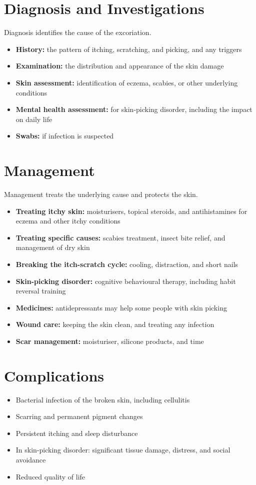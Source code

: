 \section*{Diagnosis and Investigations}
Diagnosis identifies the cause of the excoriation.
\begin{itemize}
    \item \textbf{History:} the pattern of itching, scratching, and picking, and any triggers
    \item \textbf{Examination:} the distribution and appearance of the skin damage
    \item \textbf{Skin assessment:} identification of eczema, scabies, or other underlying conditions
    \item \textbf{Mental health assessment:} for skin-picking disorder, including the impact on daily life
    \item \textbf{Swabs:} if infection is suspected
\end{itemize}

\section*{Management}
Management treats the underlying cause and protects the skin.
\begin{itemize}
    \item \textbf{Treating itchy skin:} moisturisers, topical steroids, and antihistamines for eczema and other itchy conditions
    \item \textbf{Treating specific causes:} scabies treatment, insect bite relief, and management of dry skin
    \item \textbf{Breaking the itch-scratch cycle:} cooling, distraction, and short nails
    \item \textbf{Skin-picking disorder:} cognitive behavioural therapy, including habit reversal training
    \item \textbf{Medicines:} antidepressants may help some people with skin picking
    \item \textbf{Wound care:} keeping the skin clean, and treating any infection
    \item \textbf{Scar management:} moisturiser, silicone products, and time
\end{itemize}

\section*{Complications}
\begin{itemize}
    \item Bacterial infection of the broken skin, including cellulitis
    \item Scarring and permanent pigment changes
    \item Persistent itching and sleep disturbance
    \item In skin-picking disorder: significant tissue damage, distress, and social avoidance
    \item Reduced quality of life
\end{itemize}

